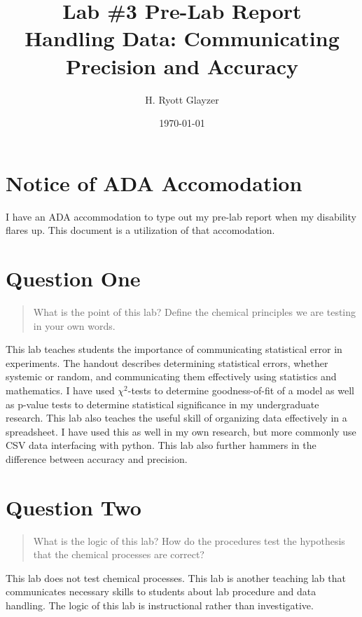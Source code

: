 \documentclass[11pt, letterpaper]{article}
\begin{document}


\title{Lab \#3 Pre-Lab Report \\ \large Handling Data: Communicating Precision and Accuracy}
\author{H. Ryott Glayzer}
\date{\today}


\maketitle


\section*{Notice of ADA Accomodation}
I have an ADA accommodation to type out my pre-lab report when my disability flares up.
This document is a utilization of that accomodation.
\Bicycle

\section{Question One}
\begin{quote}
    What is the point of this lab? Define the chemical principles we are testing in your own words.
\end{quote}
This lab teaches students the importance of communicating statistical error in experiments. 
The handout describes determining statistical errors, whether systemic or random, and communicating them effectively
using statistics and mathematics.
I have used $\chi^{2}$-tests to determine goodness-of-fit of a model as well as p-value tests to determine
statistical significance in my undergraduate research.
This lab also teaches the useful skill of organizing data effectively in a spreadsheet.
I have used this as well in my own research, but more commonly use CSV data interfacing with python.
This lab also further hammers in the difference between accuracy and precision.

\section{Question Two}
\begin{quote}
    What is the logic of this lab? How do the procedures test the hypothesis that the chemical 
    processes are correct?
\end{quote}
This lab does not test chemical processes. 
This lab is another teaching lab that communicates necessary skills to students about lab procedure
and data handling.
The logic of this lab is instructional rather than investigative.
\end{document}
